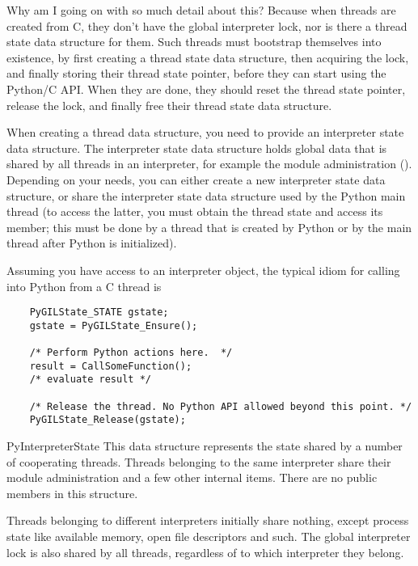 Why am I going on with so much detail about this?  Because when
threads are created from C, they don't have the global interpreter
lock, nor is there a thread state data structure for them.  Such
threads must bootstrap themselves into existence, by first creating a
thread state data structure, then acquiring the lock, and finally
storing their thread state pointer, before they can start using the
Python/C API.  When they are done, they should reset the thread state
pointer, release the lock, and finally free their thread state data
structure.

When creating a thread data structure, you need to provide an
interpreter state data structure.  The interpreter state data
structure holds global data that is shared by all threads in an
interpreter, for example the module administration
().  Depending on your needs, you can either create
a new interpreter state data structure, or share the interpreter state
data structure used by the Python main thread (to access the latter,
you must obtain the thread state and access its  member;
this must be done by a thread that is created by Python or by the main
thread after Python is initialized).

Assuming you have access to an interpreter object, the typical idiom
for calling into Python from a C thread is

\begin{verbatim}
    PyGILState_STATE gstate;
    gstate = PyGILState_Ensure();

    /* Perform Python actions here.  */
    result = CallSomeFunction();
    /* evaluate result */

    /* Release the thread. No Python API allowed beyond this point. */
    PyGILState_Release(gstate);
\end{verbatim}

\begin{ctypedesc}{PyInterpreterState}
  This data structure represents the state shared by a number of
  cooperating threads.  Threads belonging to the same interpreter
  share their module administration and a few other internal items.
  There are no public members in this structure.

  Threads belonging to different interpreters initially share nothing,
  except process state like available memory, open file descriptors
  and such.  The global interpreter lock is also shared by all
  threads, regardless of to which interpreter they belong.
\end{ctypedesc}

